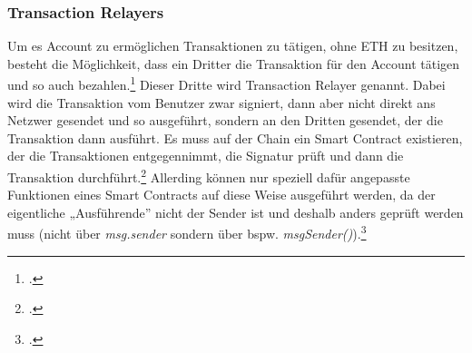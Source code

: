 \subsubsection{Transaction Relayers}
\label{sec:definition-transaction-relayers}
Um es Account zu ermöglichen Transaktionen zu tätigen, ohne ETH zu besitzen, besteht die Möglichkeit, dass ein Dritter die Transaktion für den Account tätigen und so auch bezahlen.\footcites[Vgl. hierzu, zum Folgenden und weiterführend][]{w24}[]{w26}
Dieser Dritte wird Transaction Relayer genannt.
Dabei wird die Transaktion vom Benutzer zwar signiert, dann aber nicht direkt ans Netzwer gesendet und so ausgeführt, sondern an den Dritten gesendet, der die Transaktion dann ausführt.
Es muss auf der Chain ein Smart Contract existieren, der die Transaktionen entgegennimmt, die Signatur prüft und dann die Transaktion durchführt.\footcite[Vgl.][]{w25}
Allerding können nur speziell dafür angepasste Funktionen eines Smart Contracts auf diese Weise ausgeführt werden, da der eigentliche „Ausführende” nicht der Sender ist und deshalb anders geprüft werden muss (nicht über \textit{msg.sender} sondern über bspw. \textit{msgSender()}).\footcites[Vgl.][]{w27}[]{w24}